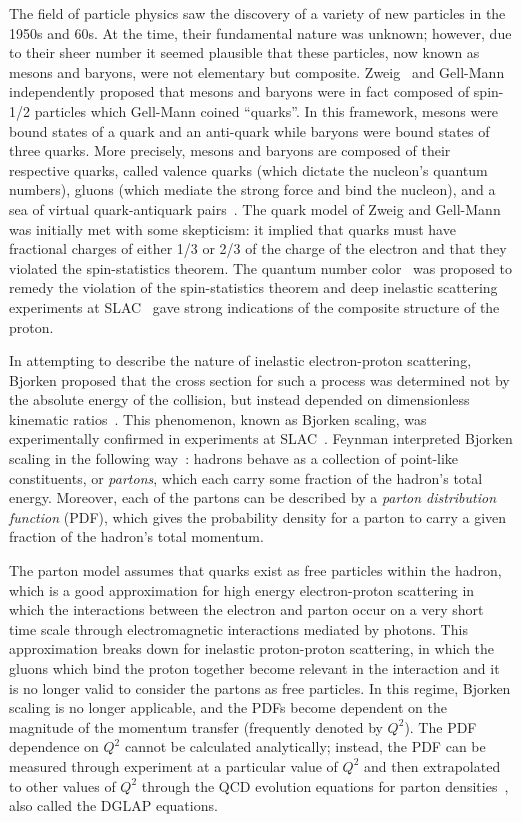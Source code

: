 The field of particle physics saw the discovery of a variety of new particles in the 1950s and 60s.
At the time, their fundamental nature was unknown; however, due to their sheer number it seemed plausible that these particles, now known as mesons and baryons, were not elementary but composite.
Zweig~\cite{Zweig:1964jf} and Gell-Mann~\cite{GellMann:1964nj} independently proposed that mesons and baryons were in fact composed of spin-1/2 particles which Gell-Mann coined ``quarks''.
In this framework, mesons were bound states of a quark and an anti-quark while baryons were bound states of three quarks. More precisely, mesons and baryons are composed of their respective quarks, called valence quarks (which dictate the nucleon's quantum numbers), gluons (which mediate the strong force and bind the nucleon), and a sea of virtual quark-antiquark pairs~\cite{Yan:2015zoa}. 
The quark model of Zweig and Gell-Mann was initially met with some skepticism: it implied that quarks must have fractional charges of either 1/3 or 2/3 of the charge of the electron and that they violated the spin-statistics theorem.
The quantum number color~\cite{Greenberg:1964pe} was proposed to remedy the violation of the spin-statistics theorem and deep inelastic scattering experiments at SLAC~\cite{Breidenbach:1969kd,Bloom:1969kc} gave strong indications of the composite structure of the proton.

In attempting to describe the nature of inelastic electron-proton scattering, Bjorken proposed that the cross section for such a process was determined not by the absolute energy of the collision, but instead depended on dimensionless kinematic ratios~\cite{Bjorken:1969ja}.
This phenomenon, known as Bjorken scaling, was experimentally confirmed in experiments at SLAC~\cite{Prentki:1968fha}. 
Feynman interpreted Bjorken scaling in the following way~\cite{Feynman:1969ej}: hadrons behave as a collection of point-like constituents, or \emph{partons}, which each carry some fraction of the hadron's total energy.
Moreover, each of the partons can be described by a \emph{parton distribution function} (PDF), which gives the probability density for a parton to carry a given fraction of the hadron's total momentum.

The parton model assumes that quarks exist as free particles within the hadron, which is a good approximation for high energy electron-proton scattering in which the interactions between the electron and parton occur on a very short time scale through electromagnetic interactions mediated by photons.
This approximation breaks down for inelastic proton-proton scattering, in which the gluons which bind the proton together become relevant in the interaction and it is no longer valid to consider the partons as free particles.
In this regime, Bjorken scaling is no longer applicable, and the PDFs become dependent on the magnitude of the momentum transfer (frequently denoted by $Q^2$).
The PDF dependence on $Q^2$ cannot be calculated analytically; instead, the PDF can be measured through experiment at a particular value of $Q^2$ and then extrapolated to other values of $Q^2$ through the QCD evolution equations for parton densities~\cite{Altarelli:1977zs,Dokshitzer:1977sg,Gribov:1972ri}, also called the DGLAP equations.

